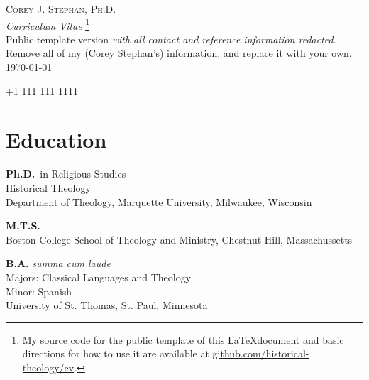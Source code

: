 \documentclass[letterpaper,12pt]{article}
\newcommand{\years}[1]{%
  {\reversemarginpar\strut\marginnote{{\small#1}}}%
}
\begin{document}
{
\begin{center}
  \Huge \textsc{Corey J. Stephan, Ph.D.} \\
  
  \normalsize \emph{Curriculum Vitae}
  \footnote{My source code for the public template of this \LaTeX\space document and basic directions for how to use it are available at \href{https:www.github.com/historical-theology/cv}{github.com/historical-theology/cv}.} \\
	Public template version \emph{with all contact and reference information redacted}.\\
	Remove all of my (Corey Stephan's) information, and replace it with your own.\\ 
   														
  \today
\end{center}
  \begin{center}
    \normalsize
      \faPhone\space+1 111 111 1111 \space 															
      \enspace\faEnvelope{} \space
      \enspace\faHome{}	
  \end{center}
}



\section*{Education}

\years{2022}%
%
\textbf{Ph.D.}\ in Religious Studies \\
Historical Theology \\
Department of Theology, Marquette University, Milwaukee, Wisconsin \\ [.3cm]
\years{2017}%
%
\textbf{M.T.S.}\ \\
Boston College School of Theology and Ministry, Chestnut Hill, Massachussetts \\ [.3cm]
\years{2015}%
%
\textbf{B.A.} \emph{summa cum laude} \\
Majors: Classical Languages and Theology \\ 
Minor: Spanish \\
University of St. Thomas, St. Paul, Minnesota
\end{document}
